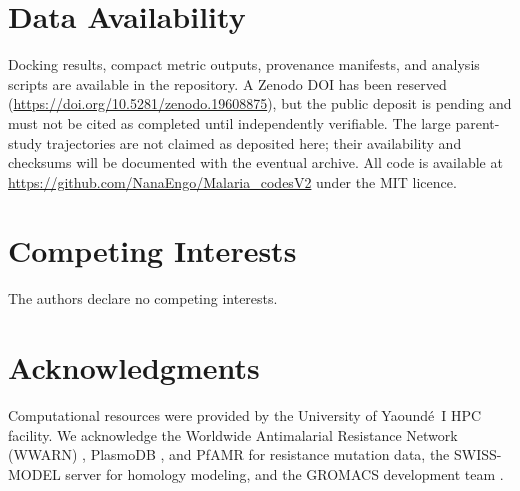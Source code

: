 \documentclass[11pt,a4paper]{article}
\begin{document}
\section*{Data Availability}

Docking results, compact metric outputs, provenance manifests, and analysis scripts are available in the repository. A Zenodo DOI has been reserved (\url{https://doi.org/10.5281/zenodo.19608875}), but the public deposit is pending and must not be cited as completed until independently verifiable. The large parent-study trajectories are not claimed as deposited here; their availability and checksums will be documented with the eventual archive. All code is available at \url{https://github.com/NanaEngo/Malaria_codesV2} under the MIT licence.

\section*{Competing Interests}

The authors declare no competing interests.

\section*{Acknowledgments}

Computational resources were provided by the University of Yaound\'{e}~I HPC facility. We acknowledge the Worldwide Antimalarial Resistance Network (WWARN) \citep{wwarn_2026}, PlasmoDB \citep{plasmodb_2026}, and PfAMR \citep{pfamr_2026} for resistance mutation data, the SWISS-MODEL server for homology modeling, and the GROMACS development team \citep{lindahl_2024}.




\end{document}

